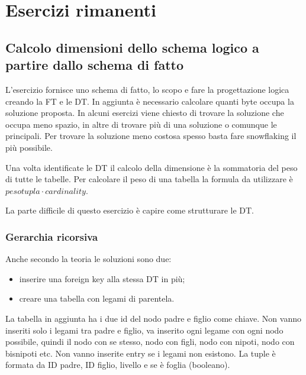 \section{Esercizi rimanenti}
\subsection{Calcolo dimensioni dello schema logico a partire dallo schema di fatto}
L'esercizio fornisce uno schema di fatto, lo scopo e fare la progettazione logica creando la FT e le DT. In aggiunta è necessario calcolare quanti byte occupa la soluzione proposta. In alcuni esercizi viene chiesto di trovare la soluzione che occupa meno spazio, in altre di trovare più di una soluzione o comunque le principali. Per trovare la soluzione meno costosa spesso basta fare snowflaking il più possibile.\newline

\noindent Una volta identificate le DT il calcolo della dimensione è la sommatoria del peso di tutte le tabelle. Per calcolare il peso di una tabella la formula da utilizzare è $pesotupla \cdot cardinality$.\newline

\noindent La parte difficile di questo esercizio è capire come strutturare le DT.

\subsubsection{Gerarchia ricorsiva}
Anche secondo la teoria le soluzioni sono due:
\begin{itemize}
	\item inserire una foreign key alla stessa DT in più;
	\item creare una tabella con legami di parentela.
\end{itemize}
La tabella in aggiunta ha i due id del nodo padre e figlio come chiave. Non vanno inseriti solo i legami tra padre e figlio, va inserito ogni legame con ogni nodo possibile, quindi il nodo con se stesso, nodo con figli, nodo con nipoti, nodo con bisnipoti etc. Non vanno inserite entry se i legami non esistono. La tuple è formata da ID padre, ID figlio, livello e se è foglia (booleano).
